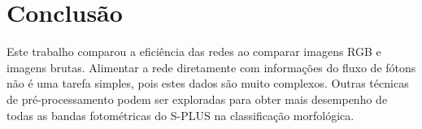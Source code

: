 \section{Conclusão}

Este trabalho comparou a eficiência das redes ao comparar imagens RGB e imagens brutas. Alimentar a rede diretamente com informações do fluxo de fótons não é uma tarefa simples, pois estes dados são muito complexos. Outras técnicas de pré-processamento podem ser exploradas para obter mais desempenho de todas as bandas fotométricas do S-PLUS na classificação morfológica.

\pagebreak

